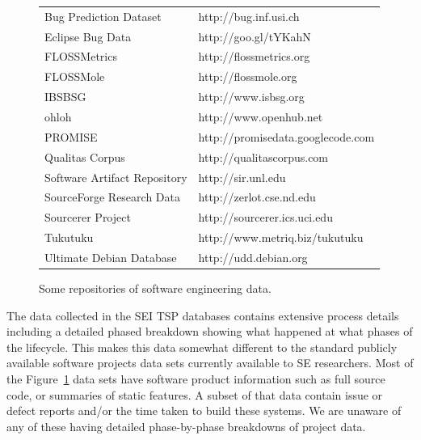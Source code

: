 \documentclass{sig-alternate}
\newcommand{\fig}[1]{Figure~\ref{fig:#1}}
\begin{document}
\begin{figure}
\begin{center}
\scriptsize\begin{tabular}{|l@{~:~}l|}\hline
Bug Prediction Dataset &http://bug.inf.usi.ch \\
Eclipse Bug Data &http://goo.gl/tYKahN \\
FLOSSMetrics& http://flossmetrics.org \\
FLOSSMole &http://flossmole.org \\
IBSBSG& http://www.isbsg.org \\
ohloh& http://www.openhub.net \\
PROMISE &http://promisedata.googlecode.com \\
Qualitas Corpus &http://qualitascorpus.com \\
Software Artifact Repository &http://sir.unl.edu \\
SourceForge Research Data &http://zerlot.cse.nd.edu \\
Sourcerer Project &http://sourcerer.ics.uci.edu \\
Tukutuku &http://www.metriq.biz/tukutuku \\
Ultimate Debian Database &http://udd.debian.org\\\hline
\end{tabular}
\end{center}
\caption{Some repositories of software engineering data.}\label{fig:sedata}
\end{figure}
The data collected in the SEI TSP databases contains 
extensive process details
including a detailed phased breakdown showing what happened at what
phases of the lifecycle. This makes this data somewhat different to the standard
 publicly available
software projects data sets currently available to 
SE researchers. Most of the \fig{sedata} data sets have software product information
such as full source code, or summaries of static features.
A subset of that data contain issue or defect reports and/or
the time taken to build these systems.  We are unaware
of any of these having detailed phase-by-phase breakdowns of project data.
\end{document}
